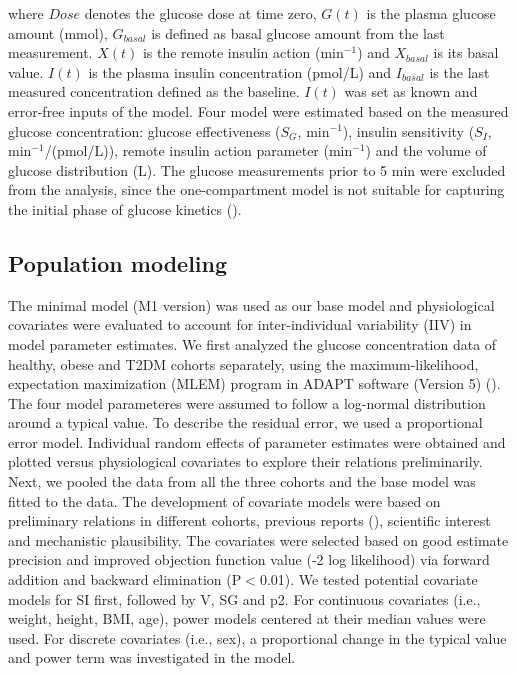\documentclass[utf8]{frontiersSCNS} %
\begin{document}
where $Dose$ denotes the glucose dose at time zero, $G(t)$ is the plasma glucose amount (mmol), $G_{basal}$ is defined as basal glucose amount from the last measurement. $X(t)$ is the remote insulin action (min$^{-1}$) and $X_{basal}$ is its basal value. $I(t)$ is the plasma insulin concentration (pmol/L) and $I_{basal}$ is the last measured concentration defined as the baseline. $I(t)$ was set as known and error-free inputs of the model. Four model were estimated based on the measured glucose concentration: glucose effectiveness ($S_G$, min$^{-1}$), insulin sensitivity ($S_I$, min$^{-1}$/(pmol/L)), remote insulin action parameter (min$^{-1}$) and the volume of glucose distribution (L). The glucose measurements prior to 5 min were excluded from the analysis, since the one-compartment model is not suitable for capturing the initial phase of glucose kinetics (\cite{Vicini1999}). \\

\subsection{Population modeling}
The minimal model (M1 version) was used as our base model and physiological covariates were evaluated to account for inter-individual variability (IIV) in model parameter estimates. We first analyzed the glucose concentration data of healthy, obese and T2DM cohorts separately, using the maximum-likelihood, expectation maximization (MLEM) program in ADAPT software (Version 5) (\cite{DArgenioDavidZ.SchumitzkyAlan2009}). The four model parameteres were assumed to follow a log-normal distribution around a typical value. To describe the residual error, we used a proportional error model. %
Individual random effects of parameter estimates were obtained and plotted versus physiological covariates to explore their relations preliminarily. %
Next, we pooled the data from all the three cohorts and the base model was fitted to the data. The development of covariate models were based on preliminary relations in different cohorts, previous reports (\cite{Denti2010}), %
scientific interest and mechanistic plausibility. The covariates were selected based on good estimate precision and improved objection function value (-2 log likelihood) via forward addition and backward elimination (P$<$0.01). We tested potential covariate models for SI first, followed by V, SG and p2. For continuous covariates (i.e., weight, height, BMI, age), power models centered at their median values were used. For discrete covariates (i.e., sex), a proportional change in the typical value and power term was investigated in the model. 
\end{document}
